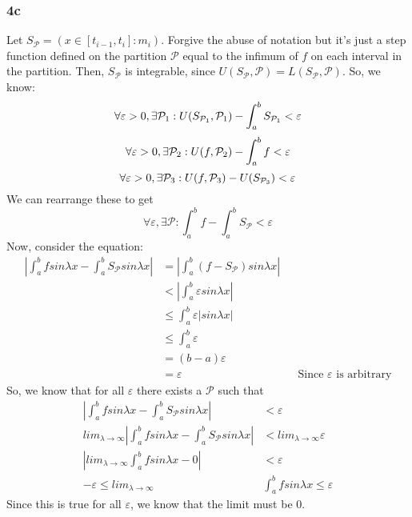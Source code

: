 \documentclass{article}
\newcommand{\sfunc}{S_{\mathcal{P}}}
\newcommand{\si}{sin\lambda x}
\begin{document}
\subsubsection*{4c}
Let $S_{\mathcal{P}} = (x \in [t_{i-1}, t_{i}]: m_{i})$. Forgive the abuse of notation but it's just a step function defined on the partition $\mathcal{P}$ equal to the infimum of $f$ on each interval in the partition. Then, $\sfunc$ is integrable, since $U(\sfunc, \mathcal{P}) = L(\sfunc, \mathcal{P})$. So, we know:
\begin{equation*}
\forall \varepsilon > 0, \exists \mathcal{P}_{1}: U(S_{\mathcal{P}_{1}}, \mathcal{P}_{1}) - \int_{a}^{b} S_{\mathcal{P}_{1}} < \varepsilon\\
\end{equation*}
\begin{equation*}
\forall \varepsilon > 0, \exists \mathcal{P}_{2}: U(f, \mathcal{P}_{2}) - \int_{a}^{b}f < \varepsilon\\
\end{equation*}
\begin{equation*}
\forall \varepsilon > 0, \exists \mathcal{P}_{3}: U(f, \mathcal{P}_{3}) - U(S_{\mathcal{P}_{3}}) < \varepsilon\\
\end{equation*}
We can rearrange these to get 
\begin{equation*}
\forall \varepsilon, \exists \mathcal{P}: \int_{a}^{b} f - \int_{a}^{b} \sfunc < \varepsilon
\end{equation*}
Now, consider the equation:
\begin{align*}
\left| \int_{a}^{b} f\si - \int_{a}^{b} \sfunc \si \right| &= \left|\int_{a}^{b}(f - \sfunc) \si \right|\\
&< \left|\int_{a}^{b} \varepsilon \si \right|\\
&\leq \int_{a}^{b} \varepsilon |\si|\\
&\leq \int_{a}^{b} \varepsilon\\
&= (b-a) \varepsilon\\
&= \varepsilon &&\text{Since $\varepsilon$ is arbitrary}
\end{align*}
So, we know that for all $\varepsilon$ there exists a $\mathcal{P}$ such that
\begin{align*}
\left| \int_{a}^{b} f\si - \int_{a}^{b} \sfunc \si \right| &< \varepsilon\\
lim_{\lambda \rightarrow \infty} \left| \int_{a}^{b} f\si - \int_{a}^{b} \sfunc \si \right| &< lim_{\lambda \rightarrow \infty} \varepsilon\\
\left| lim_{\lambda \rightarrow \infty}  \int_{a}^{b} f\si  - 0 \right| &< \varepsilon\\
-\varepsilon \leq  lim_{\lambda \rightarrow \infty} & \int_{a}^{b} f\si \leq \varepsilon
\end{align*}
Since this is true for all $\varepsilon$, we know that the limit must be 0.
\end{document}

